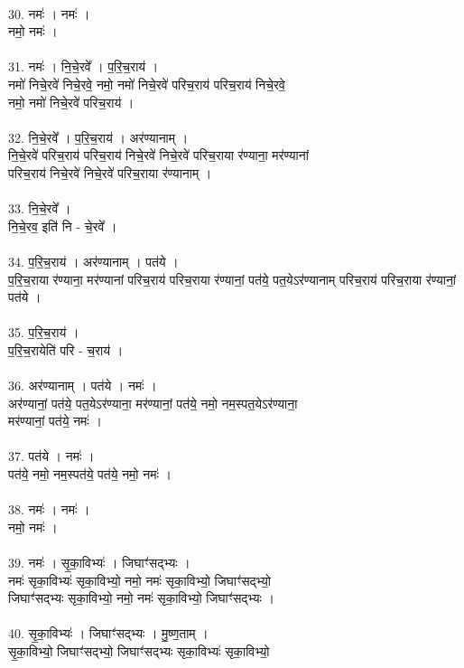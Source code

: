 \\
30. नमः॑ । नमः॑ ।\\
नमो॒ नमः॑ ।\\
\\
31. नमः॑ । नि॒चे॒रवे᳚ । प॒रि॒च॒राय॑ ।\\
नमो॑ निचे॒रवे॑ निचे॒रवे॒ नमो॒ नमो॑ निचे॒रवे॑ परिच॒राय॑ परिच॒राय॑ निचे॒रवे॒\\
नमो॒ नमो॑ निचे॒रवे॑ परिच॒राय॑ ।\\
\\
32. नि॒चे॒रवे᳚ । प॒रि॒च॒राय॑ । अर॑ण्यानाम् ।\\
नि॒चे॒रवे॑ परिच॒राय॑ परिच॒राय॑ निचे॒रवे॑ निचे॒रवे॑ परिच॒राया र॑ण्याना॒ मर॑ण्यानां\\
परिच॒राय॑ निचे॒रवे॑ निचे॒रवे॑ परिच॒राया र॑ण्यानाम् ।\\
\\
33. नि॒चे॒रवे᳚ ।\\
नि॒चे॒रव॒ इति॑ नि - चे॒रवे᳚ ।\\
\\
34. प॒रि॒च॒राय॑ । अर॑ण्यानाम् । पत॑ये ।\\
प॒रि॒च॒राया र॑ण्याना॒ मर॑ण्यानां परिच॒राय॑ परिच॒राया र॑ण्यानां॒ पत॑ये॒ पत॒येऽर॑ण्यानाम् परिच॒राय॑ परिच॒राया र॑ण्यानां॒ पत॑ये ।\\
\\
35. प॒रि॒च॒राय॑ ।\\
प॒रि॒च॒रायेति॑ परि - च॒राय॑ ।\\
\\
36. अर॑ण्यानाम् । पत॑ये । नमः॑ ।\\
अर॑ण्यानां॒ पत॑ये॒ पत॒येऽर॑ण्याना॒ मर॑ण्यानां॒ पत॑ये॒ नमो॒ नम॒स्पत॒येऽर॑ण्याना॒\\
मर॑ण्यानां॒ पत॑ये॒ नमः॑ ।\\
\\
37. पत॑ये । नमः॑ ।\\
पत॑ये॒ नमो॒ नम॒स्पत॑ये॒ पत॑ये॒ नमो॒ नमः॑ ।\\
\\
38. नमः॑ । नमः॑ ।\\
नमो॒ नमः॑ ।\\
\\
39. नमः॑ । सृ॒का॒विभ्यः॑ । जिघाꣳ॑सद्भ्यः ।\\
नमः॑ सृका॒विभ्यः॑ सृका॒विभ्यो॒ नमो॒ नमः॑ सृका॒विभ्यो॒ जिघाꣳ॑सद्भ्यो॒\\
जिघाꣳ॑सद्भ्यः सृका॒विभ्यो॒ नमो॒ नमः॑ सृका॒विभ्यो॒ जिघाꣳ॑सद्भ्यः ।\\
\\
40. सृ॒का॒विभ्यः॑ । जिघाꣳ॑सद्भ्यः । मु॒ष्ण॒ताम् ।\\
सृ॒का॒विभ्यो॒ जिघाꣳ॑सद्भ्यो॒ जिघाꣳ॑सद्भ्यः सृका॒विभ्यः॑ सृका॒विभ्यो॒\\
